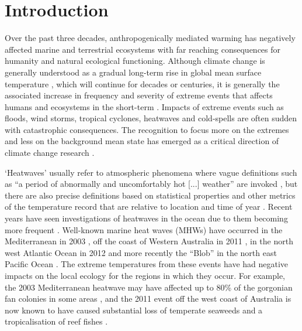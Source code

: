 \documentclass[a4paper,10pt,review]{elsarticle}
\begin{document}
\linenumbers

\section{Introduction}
Over the past three decades, anthropogenically mediated warming has negatively affected marine and terrestrial ecosystems with far reaching consequences for humanity and natural ecological functioning. Although climate change is generally understood as a gradual long-term rise in global mean surface temperature \citep{IPCC2014}, which will continue for decades or centuries, it is generally the associated increase in frequency and severity of extreme events that affects humans and ecosystems in the short-term \citep{Easterling2000}. Impacts of extreme events such as floods, wind storms, tropical cyclones, heatwaves and cold-spells are often sudden with catastrophic consequences. The recognition to focus more on the extremes and less on the background mean state has emerged as a critical direction of climate change research \citep{Jentsch2007}.

`Heatwaves' usually refer to atmospheric phenomena where vague definitions such as ``a period of abnormally and uncomfortably hot [...] weather'' are invoked \citep{Glickman2000}, but there are also precise definitions based on statistical properties and other metrics of the temperature record that are relative to location and time of year \citep[e.g.][]{Meehl2004, Alexander2006, Fischer2010, Fischer2011, Perkins2013}. Recent years have seen investigations of heatwaves in the ocean due to them becoming more frequent \citep[e.g.][]{Mackenzie2007, Selig2010, Sura2011, Lima2012, DeCastro2014}. Well-known marine heat waves (MHWs) have occurred in the Mediterranean in 2003 \citep{Black2004, Olita2007, Garrabou2009}, off the coast of Western Australia in 2011 \citep{Feng2013, Pearce2013, Wernberg2013}, in the north west Atlantic Ocean in 2012 \citep{Mills2012, Chen2014, Chen2015} and more recently the ``Blob'' in the north east Pacific Ocean \citep{Bond2015}. The extreme temperatures from these events have had negative impacts on the local ecology for the regions in which they occur. For example, the 2003 Mediterranean heatwave may have affected up to 80\% of the gorgonian fan colonies in some areas \citep{Garrabou2009}, and the 2011 event off the west coast of Australia is now known to have caused substantial loss of temperate seaweeds and a tropicalisation of reef fishes \citep{Wernberg2013}.
\end{document}
